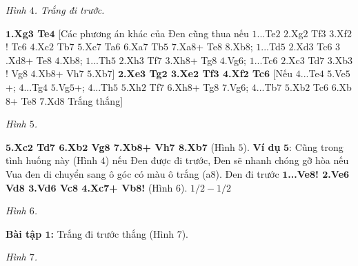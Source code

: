 \begin{multicols}{2}
	\begin{center}
		\newgame
		\scalebox{0.85}\showboard
		\vskip 0.1cm
		\textit{\small\color{gocco}Hình $4$. Trắng đi trước.}
	\end{center}
	\textbf{\color{gocco}$\pmb{1}$.Xg$\pmb{3}$ Te$\pmb{4}$} [Các phương án khác của Đen cũng thua nếu $1$...Te$2$ $2$.Xg$2$ Tf$3$ $3$.Xf$2$! Tc$6$ $4$.Xc$2$ Tb$7$ $5$.Xc$7$ Ta$6$ $6$.Xa$7$ Tb$5$ $7$.Xa$8$+ Te$8$ $8$.Xb$8$; $1$...Td$5$ $2$.Xd$3$ Tc$6$ $3$.Xd$8$+ Te$8$ $4$.Xb$8$; $1$...Th$5$ $2$.Xh$3$ Tf$7$ $3$.Xh$8$+ Tg$8$ $4$.Vg$6$; $1$...Tc$6$ $2$.Xc$3$ Td$7$ $3$.Xb$3$! Vg$8$ $4$.Xb$8$+ Vh$7$ $5$.Xb$7$]
	\vskip 0.1cm
	\textbf{\color{gocco}$\pmb{2}$.Xe$\pmb{3}$ Tg$\pmb{2}$ $\pmb{3}$.Xe$\pmb{2}$ Tf$\pmb{3}$ $\pmb{4}$.Xf$\pmb{2}$ Tc$\pmb{6}$} [Nếu $4$...Te$4$ $5$.Ve$5$+; $4$...Tg$4$ $5$.Vg$5$+; $4$...Th$5$ $5$.Xh$2$ Tf$7$ $6$.Xh$8$+ Tg$8$ $7$.Vg$6$; $4$...Tb$7$ $5$.Xb$2$ Tc$6$ $6$.Xb$8$+ Te$8$ $7$.Xd$8$ Trắng thắng]
	\begin{center}
		\newgame
		\scalebox{0.85}\showboard
		\vskip 0.1cm
		\textit{\small\color{gocco}Hình $5$.}
	\end{center}
	\columnbreak
	\textbf{\color{gocco}$\pmb{5}$.Xc$\pmb{2}$ Td$\pmb{7}$ $\pmb{6}$.Xb$\pmb{2}$ Vg$\pmb{8}$ $\pmb{7}$.Xb$\pmb{8}$+ Vh$\pmb{7}$ $\pmb{8}$.Xb$\pmb{7}$} (Hình $5$).
	\vskip 0.1cm
	\textbf{\color{gocco}Ví dụ} $\pmb{5}$:
	\vskip 0.1cm
	Cũng trong tình huống này (Hình $4$) nếu Đen được đi trước, Đen sẽ nhanh chóng gỡ hòa nếu Vua đen di chuyển  sang ô góc có màu ô trắng (a$8$).
	\vskip 0.1cm
	Đen đi trước
	\vskip 0.1cm
	\textbf{\color{gocco}$\pmb{1}$...Ve$\pmb{8}$! $\pmb{2}$.Ve$\pmb{6}$ Vd$\pmb{8}$ $\pmb{3}$.Vd$\pmb{6}$ Vc$\pmb{8}$ $\pmb{4}$.Xc$\pmb{7}$+ Vb$\pmb{8}$!} (Hình $6$).
	\vskip 0.1cm
	$1/2 - 1/2$
	\begin{center}
		\newgame
		\scalebox{0.85}\showboard
		\vskip 0.1cm
		\textit{\small\color{gocco}Hình $6$.}
	\end{center}
	\textbf{\color{gocco}Bài tập $\pmb{1}$:} Trắng đi trước thắng (Hình $7$).
	\begin{center}
		\newgame
		\scalebox{0.85}\showboard
		\vskip 0.1cm
		\textit{\small\color{gocco}Hình $7$.}
	\end{center}
\end{multicols}




